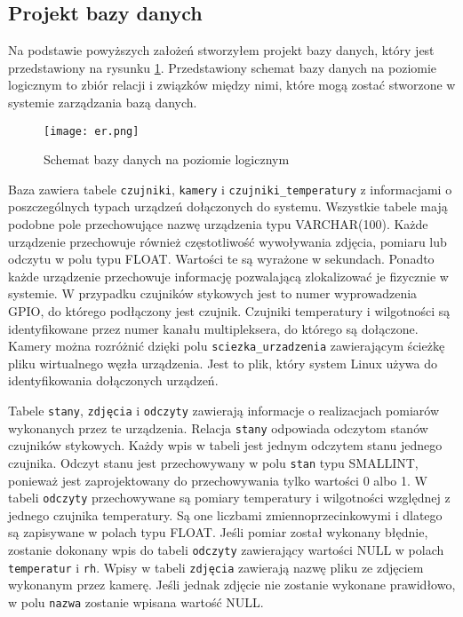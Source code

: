 \documentclass[a4paper,11pt,twoside]{article}
\begin{document}
\subsection{Projekt bazy danych}

Na podstawie powyższych założeń stworzyłem projekt bazy danych, który jest przedstawiony na rysunku \ref{fig: er}. Przedstawiony schemat bazy danych na poziomie logicznym to zbiór relacji i związków między nimi, które mogą zostać stworzone w systemie zarządzania bazą danych. 

\begin{figure}[h]
\texttt{[image: er.png]}
\caption{Schemat bazy danych na poziomie logicznym}
\label{fig: er}
\end{figure}

Baza zawiera tabele \texttt{czujniki}, \texttt{kamery} i \texttt{czujniki{\_}temperatury} z informacjami o poszczególnych typach urządzeń dołączonych do systemu. Wszystkie tabele mają podobne pole przechowujące nazwę urządzenia typu VARCHAR(100). Każde urządzenie przechowuje również częstotliwość wywoływania zdjęcia, pomiaru lub odczytu w polu typu FLOAT. Wartości te są wyrażone w sekundach. Ponadto każde urządzenie przechowuje informację pozwalającą zlokalizować je fizycznie w systemie. W przypadku czujników stykowych jest to numer wyprowadzenia GPIO, do którego podłączony jest czujnik. Czujniki temperatury i wilgotności są identyfikowane przez numer kanału multipleksera, do którego są dołączone. Kamery można rozróżnić dzięki polu \texttt{sciezka{\_}urzadzenia} zawierającym ścieżkę pliku wirtualnego węzła urządzenia. Jest to plik, który system Linux używa do identyfikowania dołączonych urządzeń. 

Tabele \texttt{stany}, \texttt{zdjęcia} i \texttt{odczyty} zawierają informacje o realizacjach pomiarów wykonanych przez te urządzenia. Relacja \texttt{stany} odpowiada odczytom stanów czujników stykowych. Każdy wpis w tabeli jest jednym odczytem  stanu jednego czujnika. Odczyt stanu jest przechowywany w polu \texttt{stan} typu SMALLINT, ponieważ jest zaprojektowany do przechowywania tylko wartości 0 albo 1. W tabeli \texttt{odczyty} przechowywane są pomiary temperatury i wilgotności względnej z jednego czujnika temperatury. Są one liczbami zmiennoprzecinkowymi i dlatego są zapisywane w polach typu FLOAT. Jeśli pomiar został wykonany błędnie, zostanie dokonany wpis do tabeli \texttt{odczyty} zawierający wartości NULL w polach \texttt{temperatur} i \texttt{rh}. Wpisy w tabeli \texttt{zdjęcia} zawierają nazwę pliku ze zdjęciem wykonanym przez kamerę. Jeśli jednak zdjęcie nie zostanie wykonane prawidłowo, w polu \texttt{nazwa} zostanie wpisana wartość NULL.
\end{document}
